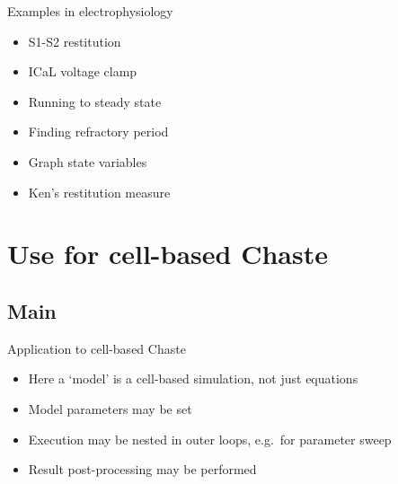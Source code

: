 \documentclass[t,xcolor={usenames,dvipsnames}]{beamer}
\begin{document}
\begin{frame}{Examples in electrophysiology}
\begin{itemize}
\item S1-S2 restitution
\item ICaL voltage clamp
\item Running to steady state
\item Finding refractory period
\item Graph state variables
\item Ken's restitution measure
\end{itemize}
\end{frame}


\section{Use for cell-based Chaste}
\subsection*{Main}

\begin{frame}{Application to cell-based Chaste}
\begin{itemize}
\item Here a `model' is a cell-based \alert{simulation}, not just equations
\item Model parameters may be set
\item Execution may be nested in outer loops, e.g.\ for parameter sweep
\item Result post-processing may be performed
\end{itemize}
\end{frame}
\end{document}
